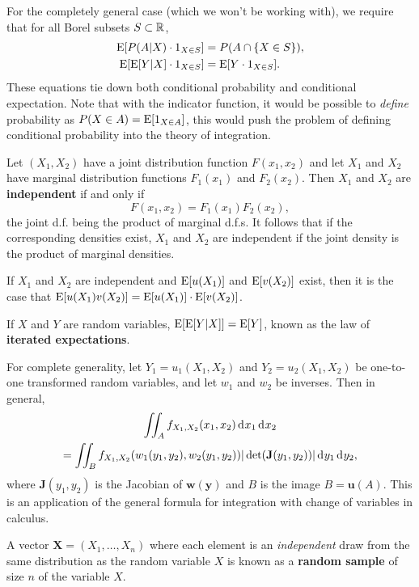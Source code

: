 \documentclass[twoside]{article}
\begin{document}
For the completely general case (which we won't be working with), we require
that for all Borel subsets $S\subset \mathbb{R}$,
\begin{align*}
  \operatorname{E}[P(A|X)\cdot 1_{X\in S}] &= P(A\cap \{X\in S\}),  \\
\operatorname{E}[\operatorname{E}[Y|X]\cdot 1_{X\in S}]      &= \operatorname{E}[Y\cdot 1_{X\in S}].
\end{align*}
These equations tie down both conditional probability and conditional
expectation. Note that with the indicator function, it would be possible to 
\emph{define} probability as $P(X\in A) = \operatorname{E}[1_{X\in A}]$, this would push the problem
of defining conditional probability into the theory of integration.




Let $(X_1,X_2)$ have a joint distribution function 
$F(x_1,x_2)$ and let $X_1$ and $X_2$ have marginal distribution functions $F_1(x_1)$
and $F_2(x_2)$. Then $X_1$ and $X_2$ are \textbf{independent} if and only if 
\[F(x_1,x_2)= F_1(x_1) F_2(x_2),\]
the joint d.f. being the product of marginal d.f.s. It follows that if the corresponding
densities exist, $X_1$ and $X_2$ are independent if the joint
density is the product of marginal densities.

If $X_1$ and $X_2$ are independent and $\operatorname{E}[u(X_1)]$ and $\operatorname{E}[v(X_2)]$ exist, then it 
is the case that $\operatorname{E}[u(X_1)v(X_2)] = \operatorname{E}[u(X_1)]\cdot \operatorname{E}[v(X_2)]$.

If $X$ and $Y$ are random variables, $\operatorname{E}\!\left[\operatorname{E}[Y|X]\right] = \operatorname{E}[Y]$, known as the law of
\textbf{iterated expectations}.


For complete generality, let $Y_1=u_1(X_1,X_2)$ and $Y_2=u_2(X_1,X_2)$ be
one-to-one transformed random variables, and let $w_1$ and $w_2$ be inverses.
Then in general, 
\begin{multline*} \int\!\!\!\int_A f_{X_1,X_2}(x_1,x_2)\rd x_1 \rd x_2 \\
= \int\!\!\!\int_B
f_{X_1,X_2} (w_1(y_1,y_2),w_2(y_1,y_2))| \det(\mathbf{J}(y_1,y_2))| \rd y_1
\rd y_2,\end{multline*} 
where $\mathbf{J}(y_1,y_2)$ is the Jacobian of $\mathbf{w}(\mathbf{y})$ and $B$ is
the image $B=\mathbf{u}(A)$. This is an application of the general formula
for integration with change of variables in calculus.


A vector $\mathbf{X}=(X_1,\dots,X_n)$ where each element is an
\emph{independent} draw from the same distribution as the random variable $X$ is
known as a \textbf{random sample} of size $n$ of the variable $X$.
\end{document}
